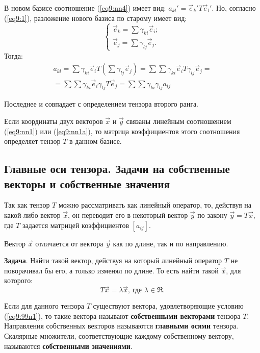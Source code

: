 	В новом базисе соотношение (\ref{eq9:nn4}) имеет вид: \( a_{kl}' = \vec{e}_k{'} T\vec{e}_l{'} \). Но, согласно (\ref{eq9:1}), разложение нового базиса по старому имеет вид:
	\[ \left\{ \begin{array}{l}
		\vec{e}_k = \sum \gamma_{ki}\vec{e}_i; \\
		\vec{e}_j = \sum \gamma_{lj}\vec{e}_j.
	\end{array} \right. \]
	Тогда:
	\[ \begin{array}{r}
		a_{kl} = \sum \gamma_{ki}\vec{e}_i T \left(\sum \gamma_{lj}\vec{e}_j\right) = \sum\sum \gamma_{ki} \vec{e}_i T \gamma_{lj}\vec{e}_j = \\
		= \sum\sum \gamma_{ki}\vec{e}_i\gamma_{lj} T\vec{e}_j = \sum\sum \gamma_{ki}\gamma_{lj} a_{ij} \end{array} \]
		
	Последнее и совпадает с определением тензора второго ранга.

	Если координаты двух векторов \( \vec{x} \) и \( \vec{y} \) связаны линейным соотношением (\ref{eq9:nn1}) или (\ref{eq9:nn1a}), то матрица коэффициентов этого соотношения определяет тензор \( T \) в данном базисе.

	
\subsection{Главные оси тензора. Задачи на собственные векторы и собственные значения}
	
	Так как тензор \( T \) можно рассматривать как линейный оператор, то, действуя на какой-либо вектор \( \vec{x} \), он переводит его в некоторый вектор \( \vec{y} \) по закону \( \vec{y} = T\vec{x} \), где \( T \) задается матрицей коэффициентов \( [a_{ij}] \).
	
	Вектор \( \vec{x} \) отличается от вектора \( \vec{y} \) как по длине, так и по направлению. %
	
	\textbf{Задача}. Найти такой вектор, действуя на который линейный оператор \( T \) не поворачивал бы его, а только изменял по длине.
	То есть найти такой \( \vec{x} \), для которого:
	\begin{equation}
		T\vec{x} = \lambda\vec{x} \text{, где } \lambda \in \Re. \label{eq9:99n1}
	\end{equation}
	
	\begin{definition}
	Если для данного тензора  \( T \) существуют вектора, удовлетворяющие условию (\ref{eq9:99n1}), то такие вектора называют \textbf{собственными векторами} тензора \( T \). Направления собственных векторов называются \textbf{главными осями} тензора. Скалярные множители, соответствующие каждому собственному вектору, называются \textbf{собственными значениями}.
	\end{definition}
	
